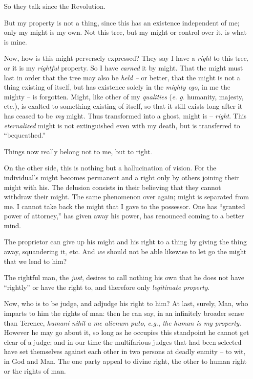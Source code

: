 \documentclass[12pt,a4paper]{book}
\begin{document}
So they talk since the Revolution.

But my property is not a thing, since this has an existence independent of me; 
only my might is my own. Not this tree, but my might or control over it, is 
what is mine.

Now, how is this might perversely expressed? They say I have a \textit{right} 
to this tree, or it is my \textit{rightful} property. So I have 
\textit{earned} it by might. That the might must last in order that the tree 
may also be \textit{held --} or better, that the might is not a thing existing 
of itself, but has existence solely in the \textit{mighty ego}, in me the 
mighty -- is forgotten. Might, like other of my \textit{qualities} (\textit{e. 
g.} humanity, majesty, etc.), is exalted to something existing of itself, so 
that it still exists long after it has ceased to be \textit{my} might. Thus 
transformed into a ghost, might is -- \textit{right}. This 
\textit{eternalized} might is not extinguished even with my death, but is 
transferred to ``bequeathed.''

Things now really belong not to me, but to right.

On the other side, this is nothing but a hallucination of vision. For the 
individual's might becomes permanent and a right only by others joining their 
might with his. The delusion consists in their believing that they cannot 
withdraw their might. The same phenomenon over again; might is separated from 
me. I cannot take back the might that I gave to the possessor. One has 
``granted power of attorney,'' has given away his power, has renounced 
coming to a better mind.

The proprietor can give up his might and his right to a thing by giving the 
thing away, squandering it, etc. And \textit{we} should not be able likewise 
to let go the might that we lend to him?

The rightful man, the \textit{just}, desires to call nothing his own that he 
does not have ``rightly'' or have the right to, and therefore only 
\textit{legitimate property}.

Now, who is to be judge, and adjudge his right to him? At last, surely, Man, 
who imparts to him the rights of man: then he can say, in an infinitely 
broader sense than Terence, \textit{humani nihil a me alienum puto}, 
\textit{e.g.}, \textit{the human is my property}. However he may go about it, 
so long as he occupies this standpoint he cannot get clear of a judge; and in 
our time the multifarious judges that had been selected have set themselves 
against each other in two persons at deadly enmity -- to wit, in God and Man. 
The one party appeal to divine right, the other to human right or the rights 
of man.
\end{document}
